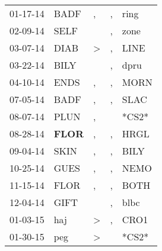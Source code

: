 \begin{supertabular}{p{0.07\textwidth}p{0.06\textwidth}p{0.02\textwidth}p{0.02\textwidth}p{0.06\textwidth}}
          01-17-14\textsuperscript{} &           BADF\textsuperscript{} &                , &                , &           ring\textsuperscript{} \\
          02-09-14\textsuperscript{} &           SELF\textsuperscript{} &                  &                , &           zone\textsuperscript{} \\
          03-07-14\textsuperscript{} &           DIAB\textsuperscript{} &     \textgreater &                , &           LINE\textsuperscript{} \\
          03-22-14\textsuperscript{} &           BILY\textsuperscript{} &                  &                , &           dpru\textsuperscript{} \\
          04-10-14\textsuperscript{} &           ENDS\textsuperscript{} &                , &                , &           MORN\textsuperscript{} \\
          07-05-14\textsuperscript{} &           BADF\textsuperscript{} &                , &                , &           SLAC\textsuperscript{} \\
          08-07-14\textsuperscript{} &           PLUN\textsuperscript{} &                , &                  &                            *CS2* \\
          08-28-14\textsuperscript{} &  \textbf{FLOR\textsuperscript{}} &                , &                , &           HRGL\textsuperscript{} \\
          09-04-14\textsuperscript{} &           SKIN\textsuperscript{} &                , &                , &           BILY\textsuperscript{} \\
          10-25-14\textsuperscript{} &           GUES\textsuperscript{} &                , &                , &           NEMO\textsuperscript{} \\
          11-15-14\textsuperscript{} &           FLOR\textsuperscript{} &                , &                , &           BOTH\textsuperscript{} \\
          12-04-14\textsuperscript{} &           GIFT\textsuperscript{} &                  &                , &           blbc\textsuperscript{} \\
          01-03-15\textsuperscript{} &            haj\textsuperscript{} &     \textgreater &                , &           CRO1\textsuperscript{} \\
          01-30-15\textsuperscript{} &            peg\textsuperscript{} &     \textgreater &                  &                            *CS2* \\

\end{supertabular}
